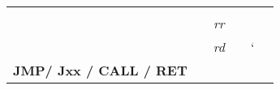 \documentclass[12pt,twoside]{templates/unerthesis}
\begin{document}
\begin{longtable}[]{@{}lccccl@{}}
\begin{minipage}[t]{0.14\columnwidth}
\strut
\end{minipage} & \begin{minipage}[t]{0.14\columnwidth}\centering
\strut
\end{minipage} & \begin{minipage}[t]{0.14\columnwidth}\centering
\strut
\end{minipage} & \begin{minipage}[t]{0.14\columnwidth}\raggedright
\strut
\end{minipage}\tabularnewline
\begin{minipage}[t]{0.14\columnwidth}\raggedright
\strut
\end{minipage} & \begin{minipage}[t]{0.14\columnwidth}\centering
\strut
\end{minipage} & \begin{minipage}[t]{0.14\columnwidth}\centering
\emph{rr}\strut
\end{minipage} & \begin{minipage}[t]{0.14\columnwidth}\centering
\strut
\end{minipage} & \begin{minipage}[t]{0.14\columnwidth}\centering
\strut
\end{minipage} & \begin{minipage}[t]{0.14\columnwidth}\raggedright
\strut
\end{minipage}\tabularnewline
\begin{minipage}[t]{0.14\columnwidth}\raggedright
\strut
\end{minipage} & \begin{minipage}[t]{0.14\columnwidth}\centering
\strut
\end{minipage} & \begin{minipage}[t]{0.14\columnwidth}\centering
\emph{rd}\strut
\end{minipage} & \begin{minipage}[t]{0.14\columnwidth}\centering
\strut
\end{minipage} & \begin{minipage}[t]{0.14\columnwidth}\centering
`\strut
\end{minipage} & \begin{minipage}[t]{0.14\columnwidth}\raggedright
\strut
\end{minipage}\tabularnewline
\begin{minipage}[t]{0.14\columnwidth}\raggedright
\textbf{JMP/ Jxx / CALL / RET}\strut
\end{minipage} & \begin{minipage}[t]{0.14\columnwidth}\centering

\end{minipage}
\end{longtable}
\end{document}
